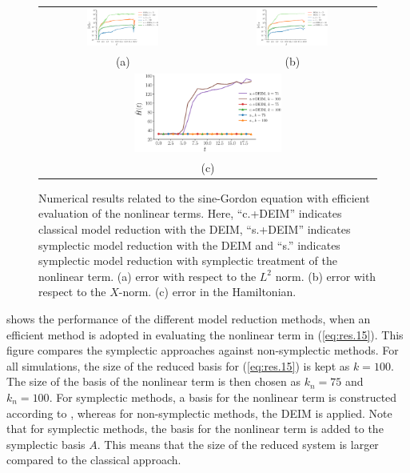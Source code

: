 \begin{figure} \label{fig:3}
\begin{tabular}{cc}
\includegraphics[width=0.45\textwidth]{./figs/sine/nonlinear/l2} & \includegraphics[width=0.45\textwidth]{./figs/sine/nonlinear/energy_norm} \\
(a) & (b) \\
\multicolumn{2}{c}{
\includegraphics[width=0.45\textwidth]{./figs/sine/nonlinear/energy}
} \\
\multicolumn{2}{c}{(c)} \\
\end{tabular}
\caption{Numerical results related to the sine-Gordon equation with efficient evaluation of the nonlinear terms. Here, ``c.+DEIM'' indicates classical model reduction with the DEIM, ``s.+DEIM'' indicates symplectic model reduction with the DEIM and ``s.'' indicates symplectic model reduction with symplectic treatment of the nonlinear term. (a) error with respect to the $L^2$ norm. (b) error with respect to the $X$-norm. (c) error in the Hamiltonian. }
\end{figure}

 shows the performance of the different model reduction methods, when an efficient method is adopted in evaluating the nonlinear term in (\ref{eq:res.15}). This figure compares the symplectic approaches against non-symplectic methods. For all simulations, the size of the reduced basis for (\ref{eq:res.15}) is kept as $k=100$. The size of the basis of the nonlinear term is then chosen as $k_n=75$ and $k_n=100$. For symplectic methods, a basis for the nonlinear term is constructed according to , whereas for non-symplectic methods, the DEIM is applied. Note that for symplectic methods, the basis for the nonlinear term is added to the symplectic basis $A$. This means that the size of the reduced system is larger compared to the classical approach.

